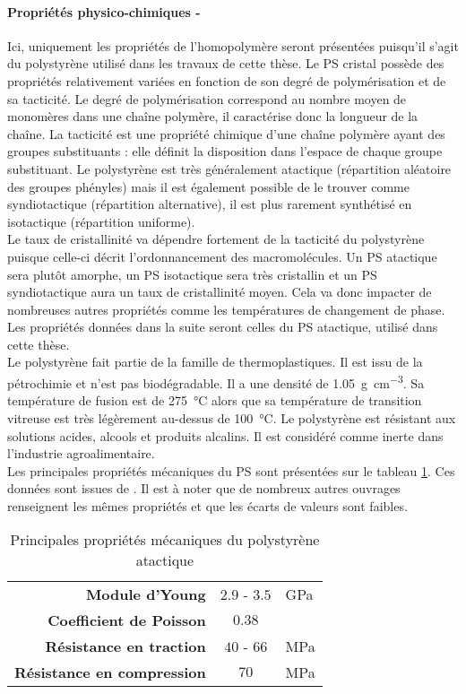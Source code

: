 			\paragraph{Propriétés physico-chimiques -}
				Ici, uniquement les propriétés de l'homopolymère seront présentées puisqu'il s'agit du polystyrène utilisé dans les travaux de cette thèse. Le PS cristal possède des propriétés relativement variées en fonction de son degré de polymérisation et de sa tacticité. Le degré de polymérisation correspond au nombre moyen de monomères dans une chaîne polymère, il caractérise donc la longueur de la chaîne. La tacticité est une propriété chimique d'une chaîne polymère ayant des groupes substituants : elle définit la disposition dans l'espace de chaque groupe substituant. Le polystyrène est très généralement atactique (répartition aléatoire des groupes phényles) mais il est également possible de le trouver comme syndiotactique (répartition alternative), il est plus rarement synthétisé en isotactique (répartition uniforme).
				\\Le taux de cristallinité va dépendre fortement de la tacticité du polystyrène puisque celle-ci décrit l'ordonnancement des macromolécules. Un PS atactique sera plutôt amorphe, un PS isotactique sera très cristallin et un PS syndiotactique aura un taux de cristallinité moyen. Cela va donc impacter de nombreuses autres propriétés comme les températures de changement de phase. Les propriétés données dans la suite seront celles du PS atactique, utilisé dans cette thèse.
				\\Le polystyrène fait partie de la famille de thermoplastiques. Il est issu de la pétrochimie et n'est pas biodégradable. Il a une densité de \SI{1.05}{\gram\per\centi\meter^3}. Sa température de fusion est de \SI{275}{\celsius} alors que sa température de transition vitreuse est très légèrement au-dessus de \SI{100}{\celsius}. Le polystyrène est résistant aux solutions acides, alcools et produits alcalins. Il est considéré comme inerte dans l'industrie agroalimentaire.
				\\Les principales propriétés mécaniques du PS sont présentées sur le tableau \ref{tab03:meca_PS}. Ces données sont issues de \citet{wypych_handbook_2016}. Il est à noter que de nombreux autres ouvrages renseignent les mêmes propriétés et que les écarts de valeurs sont faibles.
				\begin{table}\centering
					\begin{tabular}{rcl}
						\hline
						\textbf{Module d'Young} & $2.9$ - $3.5$ & \si{\giga\pascal}\\
						\textbf{Coefficient de Poisson} & $0.38$ & \\
						\textbf{Résistance en traction} & $40$ - $66$ & \si{\mega\pascal}\\
						\textbf{Résistance en compression} & $70$ & \si{\mega\pascal}\\
						\hline
					\end{tabular}
					\caption{\label{tab03:meca_PS}Principales propriétés mécaniques du polystyrène atactique}
				\end{table}
	
